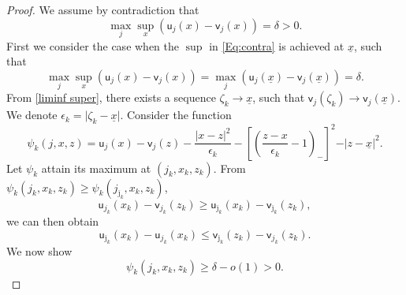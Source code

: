 \documentclass[11pt]{article}
\numberwithin{equation}{section}
\theoremstyle{Claim}
\newcommand{\ux}{{\underline x}}
\newcommand{\beq}{\begin{equation}}
\newcommand{\eeq}{\end{equation}}
\newcommand{\e}{\epsilon}
\theoremstyle{plain}
\begin{document}
\begin{proof}

We assume by contradiction that 
\beq\label{Eq:contra}
\max_j\sup_x(\mathsf{u}_j(x)-\mathsf{v}_j(x))=\delta>0.
\eeq
First we consider the case when the $\sup$ in \cref{Eq:contra} is achieved at $\ux$, such that
\beq\label{Eq:contra-bd}
\max_j\sup_x(\mathsf{u}_j(x)-\mathsf{v}_j(x))=\max_j(\mathsf{u}_j(\ux)-\mathsf{v}_j(\ux))=\delta.
\eeq
From \cref{liminf super}, there  exists a sequence $\zeta_k\to \ux$, such that $\mathsf{v}_j(\zeta_k)\to \mathsf{v}_j(\ux)$. We denote $\e_k=\vert \zeta_k-\ux\vert$. Consider the   function
\beq
\psi_k(j,x,z)=\mathsf{u}_j(x)-\mathsf{v}_j(z)-\frac{\vert x-z\vert^2}{\e_k}-\left[\left(\frac{z-x}{\e_k}-1\right)_{-}\right]^2-\vert z-\ux\vert^2.
\eeq
Let $\psi_k$ attain its maximum at $(j_{k}, x_{k},z_{k})$. From $\psi_k(j_{k},x_{k},z_{k})\geq \psi_k(j_{\bar{\jmath}_{k}},x_{k},z_{k})$, 
$$
\mathsf{u}_{j_{k}}(x_{k})-\mathsf{v}_{j_{k}}(z_{k})\geq \mathsf{u}_{\bar{\jmath}_{k}}(x_{k})-\mathsf{v}_{\bar{\jmath}_{k}}(z_{k}),
$$
we can then obtain
\beq\label{v1 v2}
\mathsf{u}_{\bar{\jmath}_{k}}(x_{k})-\mathsf{u}_{j_{k}}(x_{k})\leq \mathsf{v}_{\bar{\jmath}_{k}}(z_{k})-\mathsf{v}_{j_{k}}(z_{k}).
\eeq
We now show 
\beq\label{psi_k}
\psi_k(j_{k},x_{k},z_{k})\geq \delta-o(1)>0. 
\eeq


\end{proof}
\end{document}

